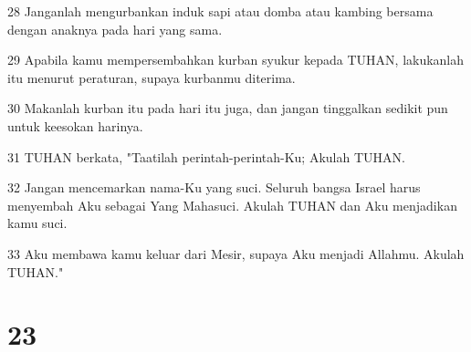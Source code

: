 \par 28 Janganlah mengurbankan induk sapi atau domba atau kambing bersama dengan anaknya pada hari yang sama.
\par 29 Apabila kamu mempersembahkan kurban syukur kepada TUHAN, lakukanlah itu menurut peraturan, supaya kurbanmu diterima.
\par 30 Makanlah kurban itu pada hari itu juga, dan jangan tinggalkan sedikit pun untuk keesokan harinya.
\par 31 TUHAN berkata, "Taatilah perintah-perintah-Ku; Akulah TUHAN.
\par 32 Jangan mencemarkan nama-Ku yang suci. Seluruh bangsa Israel harus menyembah Aku sebagai Yang Mahasuci. Akulah TUHAN dan Aku menjadikan kamu suci.
\par 33 Aku membawa kamu keluar dari Mesir, supaya Aku menjadi Allahmu. Akulah TUHAN."

\chapter{23}

